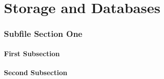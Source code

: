 \documentclass[./FDA_document_template.tex]{subfiles}
\begin{document}
\renewcommand{\onlyinsubfile}[1]{#1}
\renewcommand{\notinsubfile}[1]{}
 
\setcounter{part}{3}
\pagestyle{Standard}

\part{Storage and Databases}
 
 
 
 \section{Subfile Section One}

\lipsum[1]

\subsection{First Subsection}

\lipsum[2]

\subsection{Second Subsection}

\lipsum[3]

\bigskip
 
\end{document}
